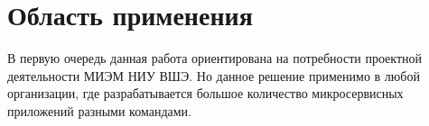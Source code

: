 \section{Область применения}
\label{sec:appl-area}

В первую очередь данная работа ориентирована на потребности проектной деятельности МИЭМ НИУ ВШЭ. Но данное решение применимо в любой организации, где разрабатывается большое количество микросервисных приложений разными командами.
